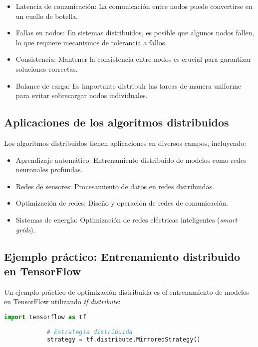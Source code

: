 \begin{itemize}
		\begin{itemize}
			\item Latencia de comunicación: La comunicación entre nodos puede convertirse en un cuello de botella.
			\item Fallas en nodos: En sistemas distribuidos, es posible que algunos nodos fallen, lo que requiere mecanismos de tolerancia a fallos.
			\item Consistencia: Mantener la consistencia entre nodos es crucial para garantizar soluciones correctas.
			\item Balance de carga: Es importante distribuir las tareas de manera uniforme para evitar sobrecargar nodos individuales.
		\end{itemize}
		
		\subsection{Aplicaciones de los algoritmos distribuidos}
		
		Los algoritmos distribuidos tienen aplicaciones en diversos campos, incluyendo:
		
		\begin{itemize}
			\item Aprendizaje automático: Entrenamiento distribuido de modelos como redes neuronales profundas.
			\item Redes de sensores: Procesamiento de datos en redes distribuidas.
			\item Optimización de redes: Diseño y operación de redes de comunicación.
			\item Sistemas de energía: Optimización de redes eléctricas inteligentes (\textit{smart grids}).
		\end{itemize}
		
		\subsection{Ejemplo práctico: Entrenamiento distribuido en TensorFlow}
		
		Un ejemplo práctico de optimización distribuida es el entrenamiento de modelos en TensorFlow utilizando \textit{tf.distribute}:
		
		\begin{lstlisting}[language=Python, caption={Entrenamiento distribuido en TensorFlow}]
			import tensorflow as tf
			
			# Estrategia distribuida
			strategy = tf.distribute.MirroredStrategy()
			

\end{lstlisting}
\end{itemize}
